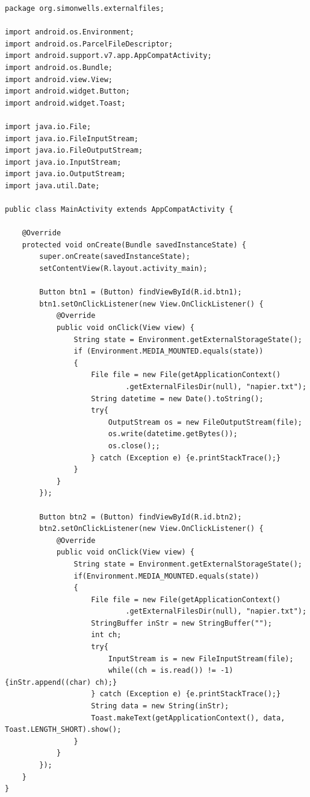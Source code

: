 \begin{lstlisting}
package org.simonwells.externalfiles;

import android.os.Environment;
import android.os.ParcelFileDescriptor;
import android.support.v7.app.AppCompatActivity;
import android.os.Bundle;
import android.view.View;
import android.widget.Button;
import android.widget.Toast;

import java.io.File;
import java.io.FileInputStream;
import java.io.FileOutputStream;
import java.io.InputStream;
import java.io.OutputStream;
import java.util.Date;

public class MainActivity extends AppCompatActivity {

    @Override
    protected void onCreate(Bundle savedInstanceState) {
        super.onCreate(savedInstanceState);
        setContentView(R.layout.activity_main);

        Button btn1 = (Button) findViewById(R.id.btn1);
        btn1.setOnClickListener(new View.OnClickListener() {
            @Override
            public void onClick(View view) {
                String state = Environment.getExternalStorageState();
                if (Environment.MEDIA_MOUNTED.equals(state))
                {
                    File file = new File(getApplicationContext()
                            .getExternalFilesDir(null), "napier.txt");
                    String datetime = new Date().toString();
                    try{
                        OutputStream os = new FileOutputStream(file);
                        os.write(datetime.getBytes());
                        os.close();;
                    } catch (Exception e) {e.printStackTrace();}
                }
            }
        });

        Button btn2 = (Button) findViewById(R.id.btn2);
        btn2.setOnClickListener(new View.OnClickListener() {
            @Override
            public void onClick(View view) {
                String state = Environment.getExternalStorageState();
                if(Environment.MEDIA_MOUNTED.equals(state))
                {
                    File file = new File(getApplicationContext()
                            .getExternalFilesDir(null), "napier.txt");
                    StringBuffer inStr = new StringBuffer("");
                    int ch;
                    try{
                        InputStream is = new FileInputStream(file);
                        while((ch = is.read()) != -1) {inStr.append((char) ch);}
                    } catch (Exception e) {e.printStackTrace();}
                    String data = new String(inStr);
                    Toast.makeText(getApplicationContext(), data, Toast.LENGTH_SHORT).show();
                }
            }
        });
    }
}
\end{lstlisting}

